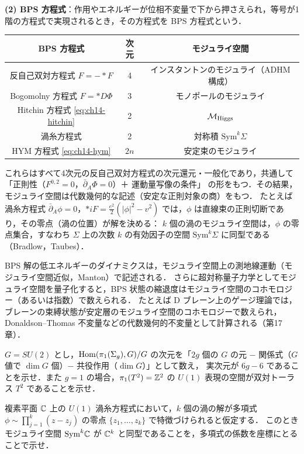 \textbf{(2) BPS 方程式}：作用やエネルギーが位相不変量で下から押さえられ，等号が1階の方程式で実現されるとき，その方程式を BPS 方程式という．
\begin{center}
\small
\begin{tabular}{c|c|c}
BPS 方程式 & 次元 & モジュライ空間 \\ \hline
反自己双対方程式 $F=-*F$ & 4 & インスタントンのモジュライ（ADHM 構成） \\
Bogomolny 方程式 $F=*D\Phi$ & 3 & モノポールのモジュライ \\
Hitchin 方程式 \eqref{eq:ch14-hitchin} & 2 & $\mathcal{M}_{\rm Higgs}$ \\
渦糸方程式 & 2 & 対称積 $\mathrm{Sym}^k\Sigma$ \\
HYM 方程式 \eqref{eq:ch14-hym} & $2n$ & 安定束のモジュライ
\end{tabular}
\end{center}
これらはすべて4次元の反自己双対方程式の次元還元・一般化であり，共通して「正則性（$F^{0,2}=0$，$\bar\partial_A\Phi=0$）＋ 運動量写像の条件」
の形をもつ．その結果，モジュライ空間は代数幾何的な記述（安定な正則対象の商）をもつ．
たとえば渦糸方程式 $\bar\partial_A\phi=0$，$*iF = \frac{e^2}{2}(|\phi|^2-v^2)$ では，$\phi$ は直線束の正則切断であり，その零点（渦の位置）が解を決める：
$k$ 個の渦のモジュライ空間は，$\phi$ の零点集合，すなわち $\Sigma$ 上の次数 $k$ の有効因子の空間 $\mathrm{Sym}^k\Sigma$ に同型である（Bradlow，Taubes）．

\begin{physbox}
BPS 解の低エネルギーのダイナミクスは，モジュライ空間上の測地線運動（モジュライ空間近似，Manton）で記述される．
さらに超対称量子力学としてモジュライ空間を量子化すると，BPS 状態の縮退度はモジュライ空間のコホモロジー（あるいは指数）で数えられる．
たとえば D ブレーン上のゲージ理論では，ブレーンの束縛状態が安定層のモジュライ空間のコホモロジーで数えられ，
Donaldson--Thomas 不変量などの代数幾何的不変量として計算される（第17章）．
\end{physbox}

$G=SU(2)$ とし，$\operatorname{Hom}(\pi_1(\Sigma_g),G)/G$ の次元を「$2g$ 個の $G$ の元 $-$ 関係式（$G$ 値で $\dim G$ 個）$-$ 共役作用（$\dim G$）」として数え，
実次元が $6g-6$ であることを示せ．また $g=1$ の場合，$\pi_1(T^2)=\mathbb{Z}^2$ の $U(1)$ 表現の空間が双対トーラス $T^2$ であることを示せ．

複素平面 $\mathbb{C}$ 上の $U(1)$ 渦糸方程式において，$k$ 個の渦の解が多項式 $\phi\sim\prod_{j=1}^k(z-z_j)$ の零点 $\{z_1,\dots,z_k\}$ で特徴づけられると仮定する．
このときモジュライ空間 $\mathrm{Sym}^k\mathbb{C}$ が $\mathbb{C}^k$ と同型であることを，多項式の係数を座標にとることで示せ．


